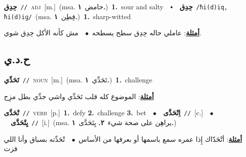 \documentclass[10pt,a4paper,twoside]{article} %
\begin{document}
\begin{multicols}{2}
{\setlength\topsep{0pt}\textbf{\foreignlanguage{arabic}{حِدِق}}\ {\color{gray}\texttt{//}\color{black}}\ \textsc{adj}\ [m.]\ \color{gray}(msa. \foreignlanguage{arabic}{حامض}~\foreignlanguage{arabic}{\textbf{١.}})\color{black}\ \textbf{1.}~sour and salty\ \ $\smblkdiamond$\ \ \setlength\topsep{0pt}\textbf{\foreignlanguage{arabic}{حِدِق}}\ {\color{gray}\texttt{/ħi(d)iq, ħi(d)iɡ/}\color{black}}\ \color{gray}(msa. \foreignlanguage{arabic}{فِطِن}~\foreignlanguage{arabic}{\textbf{١.}})\color{black}\ \textbf{1.}~sharp-witted\  \begin{flushright}\color{gray}\foreignlanguage{arabic}{\textbf{\underline{\foreignlanguage{arabic}{أمثلة}}}: عاملي حاله حِدِق سطح يسطحه\ $\bullet$\ \  مش كأنه الأكل حِدِق شوي.}\end{flushright}\color{black}} \vspace{2mm}

\vspace{-3mm}
\subsection*{\color{blue}\foreignlanguage{arabic}{ح.د.ي}\color{blue}{}} 

{\setlength\topsep{0pt}\textbf{\foreignlanguage{arabic}{تَحَدِّي}}\ {\color{gray}\texttt{//}\color{black}}\ \textsc{noun}\ [m.]\ \color{gray}(msa. \foreignlanguage{arabic}{تَحَدِّي}~\foreignlanguage{arabic}{\textbf{١.}})\color{black}\ \textbf{1.}~challenge\  \begin{flushright}\color{gray}\foreignlanguage{arabic}{\textbf{\underline{\foreignlanguage{arabic}{أمثلة}}}: الموضوع كله قلب تَحَدِّي واشي جدِّي بطل مزِح}\end{flushright}\color{black}} \vspace{2mm}

{\setlength\topsep{0pt}\textbf{\foreignlanguage{arabic}{تْحَدَّى}}\ {\color{gray}\texttt{//}\color{black}}\ \textsc{verb}\ [p.]\ \textbf{1.}~defy  \textbf{2.}~challenge  \textbf{3.}~bet\ \ $\bullet$\ \ \setlength\topsep{0pt}\textbf{\foreignlanguage{arabic}{اِتْحَدَّى}}\ {\color{gray}\texttt{//}\color{black}}\ [c.]\ \ $\bullet$\ \ \setlength\topsep{0pt}\textbf{\foreignlanguage{arabic}{يِتْحَدَّى}}\ {\color{gray}\texttt{//}\color{black}}\ [i.]\ \color{gray}(msa. \foreignlanguage{arabic}{يراهِن على صحة شيء}~\foreignlanguage{arabic}{\textbf{٢.}}  \foreignlanguage{arabic}{يِتَحَدَّى}~\foreignlanguage{arabic}{\textbf{١.}})\color{black}\  \begin{flushright}\color{gray}\foreignlanguage{arabic}{\textbf{\underline{\foreignlanguage{arabic}{أمثلة}}}: أتْحَدّاك إِذا عمره سمع باسمها أو بعرفها من الأساس\ $\bullet$\ \  تْحَدِّته بسباق وأنا اللي فزت}\end{flushright}\color{black}} \vspace{2mm}


\end{multicols}
\end{document}
